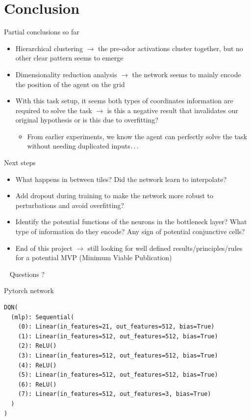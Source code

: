 \documentclass[bigger]{beamer}
\begin{document}
\section{Conclusion}
\label{sec:org8b81dae}
\begin{frame}[<+->][label={sec:org3fa0f1c}]{Partial conclusions so far}
\begin{itemize}
\item Hierarchical clustering \(\to\) the \alert{pre-odor activations} cluster together, but no other clear pattern seems to emerge
\item Dimensionality reduction analysis \(\to\) the network seems to mainly encode the \alert{position of the agent on the grid}
\item With this task setup, it seems \alert{both types of coordinates information are required} to solve the task \(\to\) is this a negative result that invalidates our original hypothesis or is this due to overfitting?
\begin{itemize}
\item From earlier experiments, we know the agent can perfectly solve the task without needing duplicated inputs\(\text{\dots}\)
\end{itemize}
\end{itemize}
\end{frame}
\begin{frame}[<+->][label={sec:orgeea9413}]{Next steps}
\begin{itemize}
\item What happens in between tiles? Did the network learn to \alert{interpolate}?
\item Add \alert{dropout} during training to make the network more robust to perturbations and avoid overfitting?
\item Identify the potential functions of the neurons in the bottleneck layer? What type of information do they encode? Any sign of potential \alert{conjunctive cells}?
\item End of this project \(\to\) still looking for well defined results/principles/rules for a potential MVP (Minimum Viable Publication)
\end{itemize}
\end{frame}
\begin{frame}[label={sec:org73781a3},standout]{~}
Questions ?
\end{frame}
\appendix
\begin{frame}[fragile]{Pytorch network}
\addtocounter{framenumber}{-1}
\scriptsize
\begin{lstlisting}
DQN(
  (mlp): Sequential(
    (0): Linear(in_features=21, out_features=512, bias=True)
    (1): Linear(in_features=512, out_features=512, bias=True)
    (2): ReLU()
    (3): Linear(in_features=512, out_features=512, bias=True)
    (4): ReLU()
    (5): Linear(in_features=512, out_features=512, bias=True)
    (6): ReLU()
    (7): Linear(in_features=512, out_features=3, bias=True)
  )
)
\end{lstlisting}
\end{frame}
\end{document}
